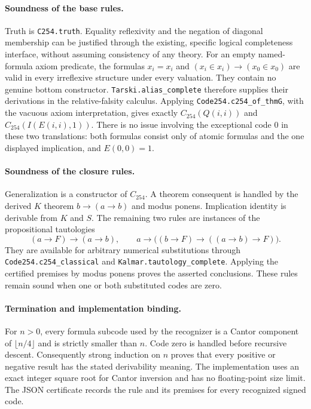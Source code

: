 \paragraph{Soundness of the base rules.}
Truth is \texttt{C254.truth}.  Equality reflexivity and the negation of
diagonal membership can be justified through the existing, specific
logical completeness interface, without assuming consistency of any
theory.  For an empty named-formula axiom predicate, the formulas
$x_i=x_i$ and $(x_i\in x_i)\to(x_0\in x_0)$ are valid in every
irreflexive structure under every valuation.  They contain no genuine
bottom constructor.  \texttt{Tarski.alias\_complete} therefore supplies
their derivations in the relative-falsity calculus.  Applying
\texttt{Code254.c254\_of\_thmG}, with the vacuous axiom interpretation,
gives exactly $C_{254}(Q(i,i))$ and $C_{254}(I(E(i,i),1))$.
There is no issue involving the exceptional code $0$ in these two
translations: both formulas consist only of atomic formulas and the
one displayed implication, and $E(0,0)=1$.

\paragraph{Soundness of the closure rules.}
Generalization is a constructor of $C_{254}$.  A theorem consequent is
handled by the derived $K$ theorem $b\to(a\to b)$ and modus ponens.
Implication identity is derivable from $K$ and $S$.  The remaining two
rules are instances of the propositional tautologies
\[
 (a\to F)\to(a\to b),\qquad
 a\to\bigl((b\to F)\to((a\to b)\to F)\bigr).
\]
They are available for arbitrary numerical substitutions through
\texttt{Code254.c254\_classical} and
\texttt{Kalmar.tautology\_complete}.  Applying the certified premises by
modus ponens proves the asserted conclusions.  These rules remain sound
when one or both substituted codes are zero.

\paragraph{Termination and implementation binding.}
For $n>0$, every formula subcode used by the recognizer is a Cantor
component of $\lfloor n/4\rfloor$ and is strictly smaller than $n$.
Code zero is handled before recursive descent.  Consequently strong
induction on $n$ proves that every positive or negative result has the
stated derivability meaning.  The implementation uses an exact integer
square root for Cantor inversion and has no floating-point size limit.
The JSON certificate records the rule and its premises for every
recognized signed code.

